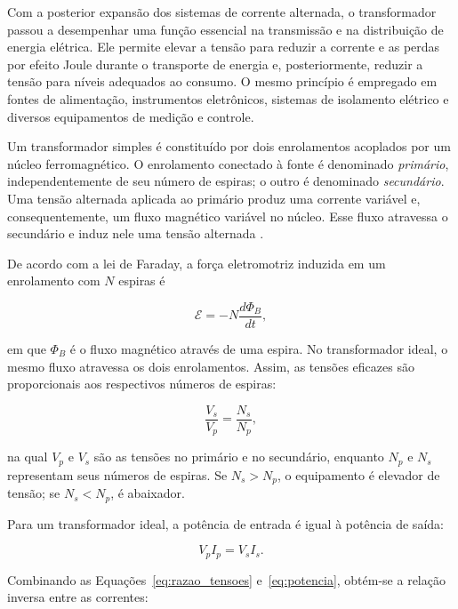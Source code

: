 \documentclass[a4paper,12pt]{article}
\begin{document}
Com a posterior expansão dos sistemas de corrente alternada, o transformador
passou a desempenhar uma função essencial na transmissão e na distribuição de
energia elétrica. Ele permite elevar a tensão para reduzir a corrente e as perdas
por efeito Joule durante o transporte de energia e, posteriormente, reduzir a
tensão para níveis adequados ao consumo. O mesmo princípio é empregado em fontes
de alimentação, instrumentos eletrônicos, sistemas de isolamento elétrico e
diversos equipamentos de medição e controle.

Um transformador simples é constituído por dois enrolamentos acoplados por um
núcleo ferromagnético. O enrolamento conectado à fonte é denominado
\emph{primário}, independentemente de seu número de espiras; o outro é denominado
\emph{secundário}. Uma tensão alternada aplicada ao primário produz uma corrente
variável e, consequentemente, um fluxo magnético variável no núcleo. Esse fluxo
atravessa o secundário e induz nele uma tensão alternada
\parencite{ling2016,halliday}.

De acordo com a lei de Faraday, a força eletromotriz induzida em um enrolamento
com $N$ espiras é

\begin{equation}
  \mathcal{E}=-N\frac{d\Phi_B}{dt},
  \label{eq:faraday}
\end{equation}

em que $\Phi_B$ é o fluxo magnético através de uma espira. No transformador
ideal, o mesmo fluxo atravessa os dois enrolamentos. Assim, as tensões eficazes
são proporcionais aos respectivos números de espiras:

\begin{equation}
  \frac{V_s}{V_p}=\frac{N_s}{N_p},
  \label{eq:razao_tensoes}
\end{equation}

na qual $V_p$ e $V_s$ são as tensões no primário e no secundário, enquanto
$N_p$ e $N_s$ representam seus números de espiras. Se $N_s>N_p$, o equipamento
é elevador de tensão; se $N_s<N_p$, é abaixador.

Para um transformador ideal, a potência de entrada é igual à potência de saída:

\begin{equation}
  V_p I_p=V_s I_s.
  \label{eq:potencia}
\end{equation}

Combinando as Equações~\eqref{eq:razao_tensoes} e~\eqref{eq:potencia}, obtém-se
a relação inversa entre as correntes:
\end{document}
